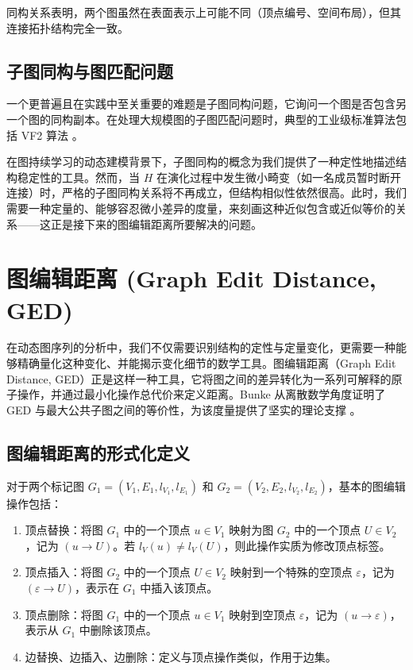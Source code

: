 同构关系表明，两个图虽然在表面表示上可能不同（顶点编号、空间布局），但其连接拓扑结构完全一致。

\subsection{子图同构与图匹配问题}

一个更普遍且在实践中至关重要的难题是子图同构问题，它询问一个图是否包含另一个图的同构副本。在处理大规模图的子图匹配问题时，典型的工业级标准算法包括 VF2 算法 \cite{cordella2004sub}。

在图持续学习的动态建模背景下，子图同构的概念为我们提供了一种定性地描述结构稳定性的工具。然而，当 $H$ 在演化过程中发生微小畸变（如一名成员暂时断开连接）时，严格的子图同构关系将不再成立，但结构相似性依然很高。此时，我们需要一种定量的、能够容忍微小差异的度量，来刻画这种近似包含或近似等价的关系——这正是接下来的图编辑距离所要解决的问题。

\section{图编辑距离 (Graph Edit Distance, GED)}

在动态图序列的分析中，我们不仅需要识别结构的定性与定量变化，更需要一种能够精确量化这种变化、并能揭示变化细节的数学工具。图编辑距离（Graph Edit Distance, GED）正是这样一种工具，它将图之间的差异转化为一系列可解释的原子操作，并通过最小化操作总代价来定义距离。Bunke 从离散数学角度证明了 GED 与最大公共子图之间的等价性，为该度量提供了坚实的理论支撑 \cite{bunke1997relation}。

\subsection{图编辑距离的形式化定义}

对于两个标记图 $G_1=(V_1,E_1,l_{V_1},l_{E_1})$ 和 $G_2=(V_2,E_2,l_{V_2},l_{E_2})$，基本的图编辑操作包括：
\begin{enumerate}[label=\arabic*.]
  \item 顶点替换：将图 $G_1$ 中的一个顶点 $u\in V_1$ 映射为图 $G_2$ 中的一个顶点 $U\in V_2$，记为
        $(u\rightarrow U)$。若 $l_V(u)\neq l_V(U)$，则此操作实质为修改顶点标签。

  \item 顶点插入：将图 $G_2$ 中的一个顶点 $U\in V_2$ 映射到一个特殊的空顶点 $\varepsilon$，记为
        $(\varepsilon\rightarrow U)$，表示在 $G_1$ 中插入该顶点。

  \item 顶点删除：将图 $G_1$ 中的一个顶点 $u\in V_1$ 映射到空顶点 $\varepsilon$，记为
        $(u\rightarrow\varepsilon)$，表示从 $G_1$ 中删除该顶点。

  \item 边替换、边插入、边删除：定义与顶点操作类似，作用于边集。
\end{enumerate}


